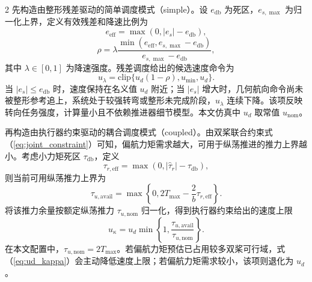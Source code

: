 \documentclass[authordraft]{ctacn}
\begin{document}
\begin{multicols}{2}
先构造由整形残差驱动的简单调度模式（simple）。设 $e_{\mathrm{db}}$ 为死区，$e_{s,\max}$ 为归一化上界，定义有效残差和降速比例为
\begin{equation}
e_{\mathrm{eff}}=\max(0,|e_s|-e_{\mathrm{db}}),
\end{equation}
\begin{equation}
\rho=\lambda
\frac{\min(e_{\mathrm{eff}},e_{s,\max}-e_{\mathrm{db}})}
{e_{s,\max}-e_{\mathrm{db}}},
\end{equation}
其中 $\lambda\in[0,1]$ 为降速强度。残差调度给出的候选速度命令为
\begin{equation}
u_{\lambda}=
\mathrm{clip}\{u_d(1-\rho),u_{\min},u_d\}.
\label{eq:simple_scheduler}
\end{equation}
当 $|e_s|\le e_{\mathrm{db}}$ 时，速度保持在名义值 $u_d$ 附近；当 $|e_s|$ 增大时，几何航向命令尚未被整形参考追上，系统处于较强转弯或整形未完成阶段，$u_{\lambda}$ 连续下降。该项反映转向任务强度，计算量小且不依赖推进器细节模型。本文仿真中 $u_d$ 取常值 $u_{\mathrm{nom}}$。

再构造由执行器约束驱动的耦合调度模式（coupled）。由双桨联合约束式（\ref{eq:joint_constraint}）可知，偏航力矩需求越大，可用于纵荡推进的推力上界越小。考虑小力矩死区 $\tau_{\mathrm{db}}$，定义
\begin{equation}
\tau_{r,\mathrm{eff}}=\max(0,|\hat{\tau}_r|-\tau_{\mathrm{db}}),
\end{equation}
则当前可用纵荡推力上界为
\begin{equation}
\tau_{u,\mathrm{avail}}
=\max\left\{0,2T_{\max}-\frac{2}{b}\tau_{r,\mathrm{eff}}\right\}.
\label{eq:tauu_avail}
\end{equation}
将该推力余量按额定纵荡推力 $\tau_{u,\mathrm{nom}}$ 归一化，得到执行器约束给出的速度上限
\begin{equation}
u_{\kappa}=u_d
\min\left\{1,\frac{\tau_{u,\mathrm{avail}}}{\tau_{u,\mathrm{nom}}}\right\}.
\label{eq:ud_kappa}
\end{equation}
在本文配置中，$\tau_{u,\mathrm{nom}}=2T_{\max}$。若偏航力矩预估已占用较多双桨可行域，式（\ref{eq:ud_kappa}）会主动降低速度上限；若偏航力矩需求较小，该项则退化为 $u_d$。


\end{multicols}
\end{document}
